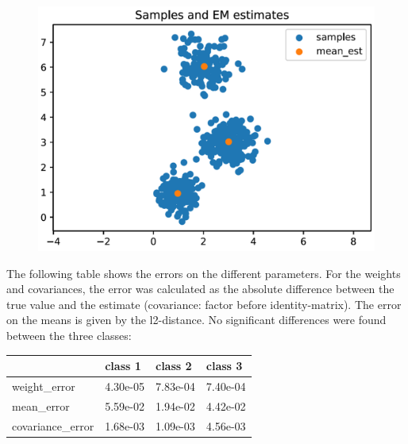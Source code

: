 \documentclass[DIV=12, ngerman, fontsize=12pt, parskip=half]{scrreprt}
\begin{document}
	\begin{figure}[H]
	\begin{center}
		\includegraphics[scale=0.4]{Task2_TestData_Mean_Est_png}
	\end{center}
	\end{figure}

	The following table shows the errors on the different parameters. For the weights and covariances, the error was calculated as the absolute difference between the true value and the estimate (covariance: factor before identity-matrix). The error on the means is given by the l2-distance. No significant differences were found between the three classes:
	
	\begin{table}[H]
	\begin{center}	
		\begin{tabular}{|l|l|l|l|}
			\hline
			& class 1  & class 2  & class 3  \\ \hline
			weight\_error     & 4.30e-05 & 7.83e-04 & 7.40e-04 \\ \hline
			mean\_error       & 5.59e-02 & 1.94e-02 & 4.42e-02 \\ \hline
			covariance\_error & 1.68e-03 & 1.09e-03 & 4.56e-03 \\ \hline
		\end{tabular}
	\end{center}
	\end{table}
	
\end{document}
